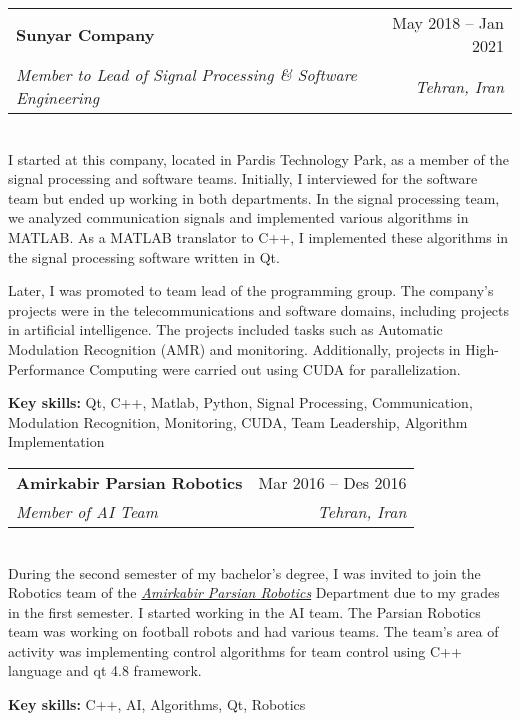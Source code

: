 \documentclass[a4paper,11pt]{article}
\makeatletter
\newcommand{\resumeQuadHeading}[4]{
\item
\begin{tabular*}{0.96\textwidth}[t]{l@{\extracolsep{\fill}}r}
\textbf{#1} & #2 \\
\textit{\small#3} & \textit{\small #4} \\
\end{tabular*}
}
\makeatother
\begin{document}
\resumeQuadHeading{\faBuilding\hspace{3px} Sunyar Company}{May 2018 -- Jan 2021}
{Member to Lead of Signal Processing \& Software Engineering}{Tehran, Iran}\\
I started at this company, located in Pardis Technology Park, as a member of the signal processing and software teams. Initially, I interviewed for the software team but ended up working in both departments. In the signal processing team, we analyzed communication signals and implemented various algorithms in MATLAB. As a MATLAB translator to C++, I implemented these algorithms in the signal processing software written in Qt.

Later, I was promoted to team lead of the programming group. The company's projects were in the telecommunications and software domains, including projects in artificial intelligence. The projects included tasks such as Automatic Modulation Recognition (AMR) and monitoring. Additionally, projects in High-Performance Computing were carried out using CUDA for parallelization.

\textbf{Key skills:} Qt, C++, Matlab, Python, Signal Processing, Communication, Modulation Recognition, Monitoring, CUDA, Team Leadership, Algorithm Implementation



\resumeQuadHeading{\faBuilding\hspace{3px} Amirkabir Parsian Robotics}{Mar 2016 -- Des 2016}
{Member of AI Team}{Tehran, Iran}\\
During the second semester of my bachelor's degree, I was invited to join the Robotics team of the \href{http://www.parsianrobotics.aut.ac.ir/}{\textit{Amirkabir Parsian Robotics}} Department due to my grades in the first semester.
I started working in the AI team. The Parsian Robotics team was working on football robots and had various teams. The team's area of activity was implementing control algorithms for team control using C++ language and qt 4.8 framework.

\textbf{Key skills:} C++, AI, Algorithms, Qt, Robotics
\end{document}
